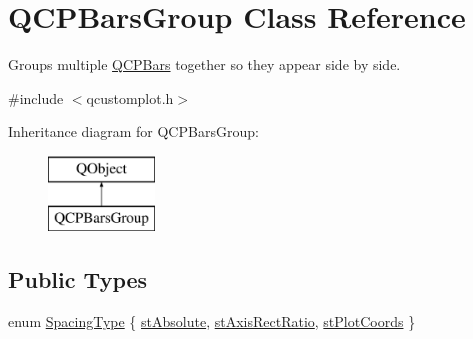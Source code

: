 \hypertarget{class_q_c_p_bars_group}{}\section{Q\+C\+P\+Bars\+Group Class Reference}
\label{class_q_c_p_bars_group}


Groups multiple \hyperlink{class_q_c_p_bars}{Q\+C\+P\+Bars} together so they appear side by side.  




{\ttfamily \#include $<$qcustomplot.\+h$>$}

Inheritance diagram for Q\+C\+P\+Bars\+Group\+:\begin{figure}[H]
\begin{center}
\leavevmode
\includegraphics[height=2.000000cm]{class_q_c_p_bars_group}
\end{center}
\end{figure}
\subsection*{Public Types}
\begin{DoxyCompactItemize}
\item 
enum \hyperlink{class_q_c_p_bars_group_a4c0521120a97e60bbca37677a37075b6}{Spacing\+Type} \{ \hyperlink{class_q_c_p_bars_group_a4c0521120a97e60bbca37677a37075b6ab53fa3efaf14867dd0f14d41d64e42ac}{st\+Absolute}, 
\hyperlink{class_q_c_p_bars_group_a4c0521120a97e60bbca37677a37075b6ae94b05c27bc985dcdd8b1e1b7f163d26}{st\+Axis\+Rect\+Ratio}, 
\hyperlink{class_q_c_p_bars_group_a4c0521120a97e60bbca37677a37075b6ad369cee6287e0a86e8c2b643a3168c54}{st\+Plot\+Coords}
 \}
\end{DoxyCompactItemize}
